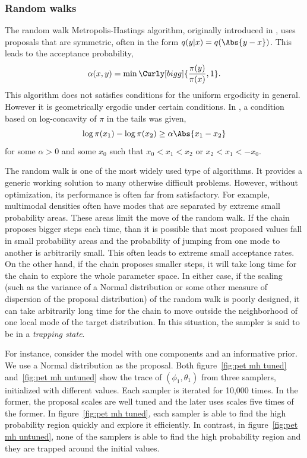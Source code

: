 \subsubsection{Random walks}
\label{ssub:Random walks}

The random walk Metropolis-Hastings algorithm, originally introduced in
\cite{Metropolis:1953ex}, uses proposals that are symmetric, often in the form
$q(y|x) = q(\Abs{y - x})$. This leads to the acceptance probability,
\begin{equation}
  \alpha(x,y) = \min\Curly[bigg]{\frac{\pi(y)}{\pi(x)},1}.
\end{equation}
This algorithm does not satisfies conditions for the uniform ergodicity in
general. However it is geometrically ergodic under certain conditions. In
\cite{Mengersen:1996th}, a condition based on log-concavity of $\pi$ in the
tails was given,
\begin{equation}
  \log\pi(x_1) - \log\pi(x_2) \ge \alpha\Abs{x_1 - x_2}
\end{equation}
for some $\alpha > 0$ and some $x_0$ such that $x_0 < x_1 < x_2$ or $x_2 < x_1
< -x_0$.

The random walk is one of the most widely used type of \mcmc algorithms. It
provides a generic working solution to many otherwise difficult problems.
However, without optimization, its performance is often far from satisfactory.
For example, multimodal densities often have modes that are separated by
extreme small probability areas. These areas limit the move of the random
walk. If the chain proposes bigger steps each time, than it is possible that
most proposed values fall in small probability areas and the probability of
jumping from one mode to another is arbitrarily small. This often leads to
extreme small acceptance rates. On the other hand, if the chain proposes
smaller steps, it will take long time for the chain to explore the whole
parameter space. In either case, if the scaling (such as the variance of a
Normal distribution or some other measure of dispersion of the proposal
distribution) of the random walk is poorly designed, it can take arbitrarily
long time for the chain to move outside the neighborhood of one local mode of
the target distribution. In this situation, the sampler is said to be in a
\emph{trapping state}.

For instance, consider the \pet model with one components and an informative
prior. We use a Normal distribution as the proposal. Both figure~\ref{fig:pet
  mh tuned} and~\ref{fig:pet mh untuned} show the trace of $(\phi_1,
\theta_1)$ from three samplers, initialized with different values. Each
sampler is iterated for 10,000 times. In the former, the proposal scales are
well tuned and the later uses scales five times of the former. In
figure~\ref{fig:pet mh tuned}, each sampler is able to find the high
probability region quickly and explore it efficiently. In contrast, in
figure~\ref{fig:pet mh untuned}, none of the samplers is able to find the high
probability region and they are trapped around the initial values.

